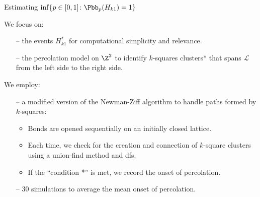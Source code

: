 \documentclass[11pt, mathserif]{beamer}
\begin{document}
    \begin{frame}
        \textcolor{blendedblue}{Estimating $\inf\{p \in [0, 1] \colon \Pbb_p(H_{k1}) = 1\}$}

        \vspace{0.4cm}
        We focus on: 
        \begin{itemize}
          \item[--] the events $H_{k1}^*$ for computational simplicity and relevance.
          \item[--] the percolation model on $\Z^2$ to identify $k$-squares clusters* that spans $\mathcal{L}$ from the left side to the right side.
        \end{itemize}
        \vspace{0.2cm}

        We employ:
        \begin{itemize}
            \item[--] a modified version of the Newman-Ziff algorithm to handle paths formed by \(k\)-squares:
            \begin{itemize}
                \item Bonds are opened sequentially on an initially closed lattice.
                \item Each time, we check for the creation and connection of $k$-square clusters using a union-find method and dfs.
                \item If the ``condition *'' is met, we record the onset of percolation.
            \end{itemize}
            \item[--] 30 simulations to average the mean onset of percolation.
        \end{itemize}
    \end{frame}

    \begin{frame}
        \vspace{0.5cm}
         
    \end{frame}
\end{document}
